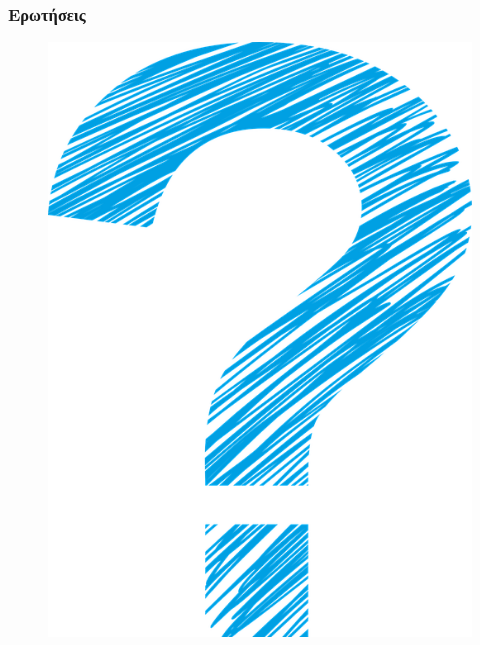 \documentclass{beamer}
\begin{document}
\begin{frame}
\frametitle{Ερωτήσεις}

\begin{figure}[H]
    \centering
    \includegraphics[height=0.8\textheight]{question_mark}
\end{figure}


\end{frame}
\end{document}
